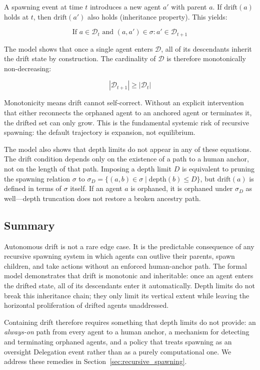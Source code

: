 A spawning event at time $t$ introduces a new agent $a'$ with parent $a$. If $\text{drift}(a)$ holds at $t$, then $\text{drift}(a')$ also holds (inheritance property). This yields:

\begin{equation}
\text{If } a \in \mathcal{D}_t \text{ and } (a, a') \in \sigma: a' \in \mathcal{D}_{t+1}
\end{equation}

The model shows that once a single agent enters $\mathcal{D}$, all of its descendants inherit the drift state by construction. The cardinality of $\mathcal{D}$ is therefore monotonically non-decreasing:

\begin{equation}
|\mathcal{D}_{t+1}| \geq |\mathcal{D}_t|
\end{equation}

Monotonicity means drift cannot self-correct. Without an explicit intervention that either reconnects the orphaned agent to an anchored agent or terminates it, the drifted set can only grow. This is the fundamental systemic risk of recursive spawning: the default trajectory is expansion, not equilibrium.

The model also shows that depth limits do not appear in any of these equations. The drift condition depends only on the existence of a path to a human anchor, not on the length of that path. Imposing a depth limit $D$ is equivalent to pruning the spawning relation $\sigma$ to $\sigma_D = \{(a, b) \in \sigma \mid \text{depth}(b) \leq D\}$, but $\text{drift}(a)$ is defined in terms of $\sigma$ itself. If an agent $a$ is orphaned, it is orphaned under $\sigma_D$ as well—depth truncation does not restore a broken ancestry path.

\subsection{Summary}

Autonomous drift is not a rare edge case. It is the predictable consequence of any recursive spawning system in which agents can outlive their parents, spawn children, and take actions without an enforced human-anchor path. The formal model demonstrates that drift is monotonic and inheritable: once an agent enters the drifted state, all of its descendants enter it automatically. Depth limits do not break this inheritance chain; they only limit its vertical extent while leaving the horizontal proliferation of drifted agents unaddressed.

Containing drift therefore requires something that depth limits do not provide: an \emph{always-on} path from every agent to a human anchor, a mechanism for detecting and terminating orphaned agents, and a policy that treats spawning as an oversight Delegation event rather than as a purely computational one. We address these remedies in Section~\ref{sec:recursive_spawning}.
